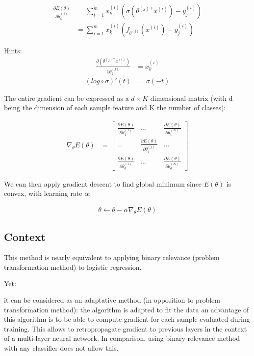 \begin{align}
	\frac{\partial E(\theta)}{\partial \theta_k^{(j)}} 
	&= \sum_{i=1}^m x^{(i)}_k (\sigma(\theta^{(j)\top} x^{(i)}) - y_j^{(i)}) \\
	&= \sum_{i=1}^m x^{(i)}_k (f_{\theta^{(j)}}(x^{(i)})  - y_j^{(i)}) 
\end{align}

Hints:
\begin{align}
	\frac{\partial (\theta^{(j)\top} x^{(i)}) }{\partial \theta_k^{(j)}}  &= x_k^{(i)} 
\end{align}
\begin{align}
	(log \circ \sigma)'(t) &= \sigma(-t)
\end{align}


The entire gradient can be expressed as a $d \times K$ dimensional matrix (with d being the dimension of each sample feature and K the number of classes):

\begin{align}
	\nabla_\theta E(\theta) 
	&= 
	\begin{bmatrix}
		\frac{\partial E(\theta)}{\partial \theta_1^{(1)}} 	& \dots 						& \frac{\partial E(\theta)}{\partial \theta_1^{(K)}} \\
		\dots 												&  \frac{\partial E(\theta)}{\partial \theta_i^{(j)}} 	& \dots \\
		\frac{\partial E(\theta)}{\partial \theta_d^{(1)}} 	& \dots 						& \frac{\partial E(\theta)}{\partial \theta_d^{(K)}}
	\end{bmatrix} 
\end{align}

We can then apply gradient descent to find global minimum since $E(\theta)$ is convex, with learning rate $\alpha$:

\begin{align}
	\theta \leftarrow \theta - \alpha \nabla_\theta E(\theta)
\end{align}



\subsection*{Context}

This method is nearly equivalent to applying binary relevance (problem transformation method) to logistic regression.

Yet:
\begin{outline}
\1 it can be considered as an adaptative method (in opposition to problem transformation method): the algorithm is adapted to fit the data
\1 an advantage of this algorithm is to be able to compute gradient for each sample evaluated during training. This allows to retropropagate gradient to previous layers in the context of a multi-layer neural network. In comparison, using binary relevance method with any classifier does not allow this.
\end{outline}



